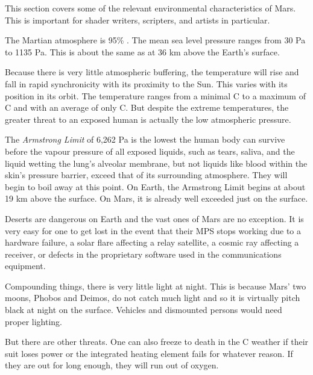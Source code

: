 

This section covers some of the relevant environmental characteristics of Mars. This is important for shader writers, scripters, and artists in particular.

The Martian atmosphere is 95\% . The mean sea level pressure ranges from 30 Pa to 1135 Pa. This is about the same as at 36 km above the Earth's surface.

Because there is very little atmospheric buffering, the temperature will rise and fall in rapid synchronicity with its proximity to the Sun. This varies with its position in its orbit. The temperature ranges from a minimal C to a maximum of C and with an average of only C. But despite the extreme temperatures, the greater threat to an exposed human is actually the low atmospheric pressure.

The {\it Armstrong Limit} of 6,262 Pa is the lowest the human body can survive before the vapour pressure of all exposed liquids, such as tears, saliva, and the liquid wetting the lung's alveolar membrane, but not liquids like blood within the skin's pressure barrier, exceed that of its surrounding atmosphere. They will begin to boil away at this point. On Earth, the Armstrong Limit begins at about 19 km above the surface. On Mars, it is already well exceeded just on the surface.

Deserts are dangerous on Earth and the vast ones of Mars are no exception. It is very easy for one to get lost in the event that their MPS stops working due to a hardware failure, a solar flare affecting a relay satellite, a cosmic ray affecting a receiver, or defects in the proprietary software used in the communications equipment.

Compounding things, there is very little light at night. This is because Mars' two moons, Phobos and Deimos, do not catch much light and so it is virtually pitch black at night on the surface. Vehicles and dismounted persons would need proper lighting.

But there are other threats. One can also freeze to death in the C weather if their suit loses power or the integrated heating element fails for whatever reason. If they are out for long enough, they will run out of oxygen.

